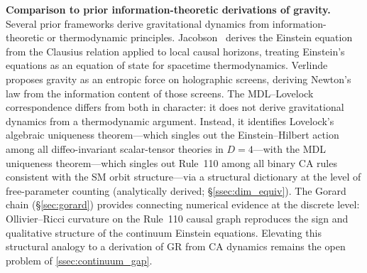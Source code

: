 \documentclass[11pt]{article}
\theoremstyle{remark}
\newcommand{\CatAD}{analytically derived}
\begin{document}
\medskip
\noindent\textbf{Comparison to prior information-theoretic derivations of gravity.}
Several prior frameworks derive gravitational dynamics from information-theoretic
or thermodynamic principles.
Jacobson~\cite{Jacobson1995} derives the Einstein equation from the Clausius
relation applied to local causal horizons, treating Einstein's equations as an
equation of state for spacetime thermodynamics.
Verlinde~\cite{Verlinde2011} proposes gravity as an entropic force on holographic
screens, deriving Newton's law from the information content of those screens.
The MDL--Lovelock correspondence differs from both in character: it does not derive
gravitational dynamics from a thermodynamic argument.
Instead, it identifies Lovelock's algebraic uniqueness theorem---which singles out
the Einstein--Hilbert action among all diffeo-invariant scalar-tensor theories in
$D = 4$---with the MDL uniqueness theorem---which singles out Rule~110 among all
binary CA rules consistent with the SM orbit structure---via a structural
dictionary at the level of free-parameter counting (\CatAD; \S\ref{ssec:dim_equiv}).
The Gorard chain (\S\ref{sec:gorard}) provides connecting numerical evidence at
the discrete level: Ollivier--Ricci curvature on the Rule~110 causal graph
reproduces the sign and qualitative structure of the continuum Einstein equations.
Elevating this structural analogy to a derivation of GR from CA dynamics remains
the open problem of \cref{ssec:continuum_gap}.
\end{document}
